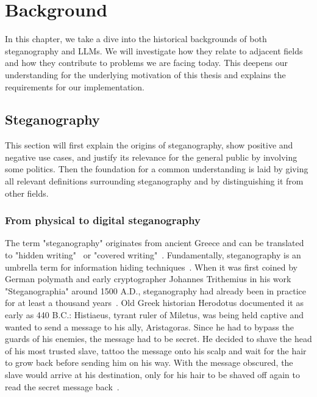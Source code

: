 
\chapter{Background}\label{ch:background}
\glsresetall %

In this chapter, we take a dive into the historical backgrounds of both steganography and \glspl{LLM}. We will investigate how they relate to adjacent fields and how they contribute to problems we are facing today. This deepens our understanding for the underlying motivation of this thesis and explains the requirements for our implementation.

\section{Steganography}
\label{sec:steganography}
This section will first explain the origins of steganography, show positive and negative use cases, and justify its relevance for the general public by involving some politics. Then the foundation for a common understanding is laid by giving all relevant definitions surrounding steganography and by distinguishing it from other fields.

\subsection{From physical to digital steganography}
\label{sec:fromPhysicalToDigitalSteganography}
The term "steganography" originates from ancient Greece and can be translated to "hidden writing"~\cite{kolataVeiledMessagesTerror2001,dembartEndUserHide2001} or "covered writing"~\cite{salleeModelBasedSteganography2004,petitcolasInformationHidingSurvey1999,bennettLinguisticSteganographySurvey2004}. Fundamentally, steganography is an umbrella term for information hiding techniques~\cite{bennettLinguisticSteganographySurvey2004}. When it was first coined by German polymath and early cryptographer Johannes Trithemius in his work "Steganographia" around 1500 A.D., steganography had already been in practice for at least a thousand years~\cite{bennettLinguisticSteganographySurvey2004}. Old Greek historian Herodotus documented it as early as 440 B.C.: Histiaeus, tyrant ruler of Miletus, was being held captive and wanted to send a message to his ally, Aristagoras. Since he had to bypass the guards of his enemies, the message had to be secret. He decided to shave the head of his most trusted slave, tattoo the message onto his scalp and wait for the hair to grow back before sending him on his way. With the message obscured, the slave would arrive at his destination, only for his hair to be shaved off again to read the secret message back~\cite{bennettLinguisticSteganographySurvey2004,petitcolasInformationHidingSurvey1999,dembartEndUserHide2001}.

